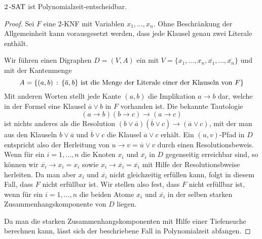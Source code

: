 \begin{thm}
	${2}\operatorname{-SAT}$ ist Polynomialzeit-entscheidbar.  
\end{thm} 
\begin{proof}
	Sei $F$ eine $2$-KNF mit Variablen $x_1,\ldots,x_n$. Ohne Beschränkung der Allgemeinheit kann vorausgesetzt werden, dass jede Klausel genau zwei Literale enthält. 
	
	Wir führen einen Digraphen $D=(V,A)$ ein mit 
	$V = \{x_1,\ldots,x_n,\overline{x_1},\ldots,\overline{x_n} \}$ und mit der Kantenmenge 
	\[
			A = \left\{ (a,b) \,:\,  \{\overline{a},b\} \ \text{ist die Menge der Literale einer der Klauseln von} \  F \right\} 
	\]
	Mit anderen Worten stellt jede Kante $(a,b)$ die Implikation $a  \to b$ dar, welche in der Formel eine Klausel $\overline{a} \vee b$ in $F$ vorhanden ist. Die bekannte Tautologie 
	\[
		 	(a \to b) (b \to c)  \to (a \to c)
	\]
	ist nichts anderes als die Resolution $(b \vee \overline{a}) ( \overline{b} \vee c) \to (\overline{a} \vee c)$, mit der man aus den Klauseln $b \vee \overline{a}$ und  $\overline{b} \vee c$ die Klausel $\overline{a} \vee c$ erhält. Ein $(u,v)$-Pfad in $D$ entspricht also der Herleitung von $u \to v = \overline{u} \vee v$ durch einen Resolutionsbeweis. Wenn für ein $i=1,\ldots,n$ die Knoten $x_i$ und $\overline{x_i}$ in $D$ gegenseitig erreichbar sind, so können wir $\overline{x_i} \to  x_i  = x_i$ sowie $x_i \to \overline{x_i} = \overline{x_i}$ mit Hilfe der Resolutionsbweise herleiten. Da man aber $x_i$ und $\overline{x_i}$ nicht gleichzeitig erfüllen kann, folgt in diesem Fall, dass $F$ nicht erfüllbar ist. 
	Wir stellen also fest, dass $F$ nicht erfüllbar ist, wenn für ein $i =1,\ldots,n$ die beiden Atome $x_i$ und $\overline{x_i}$ in der selben starken Zusammenhangskomponente von $D$ liegen. 
	
	 Da man die starken Zusammenhangskomponenten mit Hilfe einer Tiefensuche berechnen kann, lässt sich der beschriebene Fall in Polynomialzeit abfangen. 
	

\end{proof}
